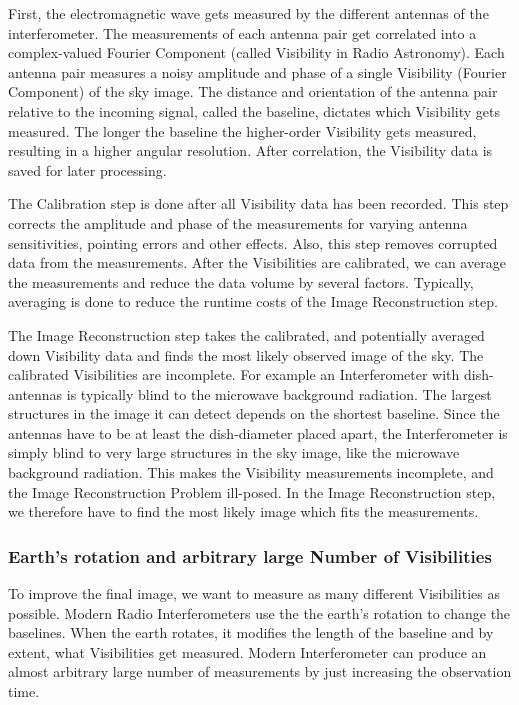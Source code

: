 First, the electromagnetic wave gets measured by the different antennas of the interferometer. The measurements of each antenna pair get correlated into a complex-valued Fourier Component (called Visibility in Radio Astronomy). Each antenna pair measures a noisy amplitude and phase of a single Visibility (Fourier Component) of the sky image. The distance and orientation of the antenna pair relative to the incoming signal, called the baseline, dictates which Visibility gets measured. The longer the baseline the higher-order Visibility gets measured, resulting in a higher angular resolution. After correlation, the Visibility data is saved for later processing.

The Calibration step is done after all Visibility data has been recorded. This step corrects the amplitude and phase of the measurements for varying antenna sensitivities, pointing errors and other effects. Also, this step removes corrupted data from the measurements. After the Visibilities are calibrated, we can average the measurements and reduce the data volume by several factors. Typically, averaging is done to reduce the runtime costs of the Image Reconstruction step.

The Image Reconstruction step takes the calibrated, and potentially averaged down Visibility data and finds the most likely observed image of the sky. The calibrated Visibilities are incomplete. For example an Interferometer with dish-antennas is typically blind to the microwave background radiation. The largest structures in the image it can detect depends on the shortest baseline. Since the antennas have to be at least the dish-diameter placed apart, the Interferometer is simply blind to very large structures in the sky image, like the microwave background radiation. This makes the Visibility measurements incomplete, and the Image Reconstruction Problem ill-posed. In the Image Reconstruction step, we therefore have to find the most likely image which fits the measurements.

\subsubsection{Earth's rotation and arbitrary large Number of Visibilities}
To improve the final image, we want to measure as many different Visibilities as possible. Modern Radio Interferometers use the the earth's rotation to change the baselines. When the earth rotates, it modifies the length of the baseline and by extent, what Visibilities get measured. Modern Interferometer can produce an almost arbitrary large number of measurements by just increasing the observation time.

